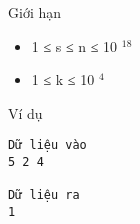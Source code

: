 Giới hạn
\begin{itemize}
	\item     1 ≤ s ≤ n ≤ 10    $^     18    $
	\item     1 ≤ k ≤ 10    $^     4    $
\end{itemize}
Ví dụ
\begin{verbatim}
Dữ liệu vào
5 2 4

Dữ liệu ra
1
\end{verbatim}